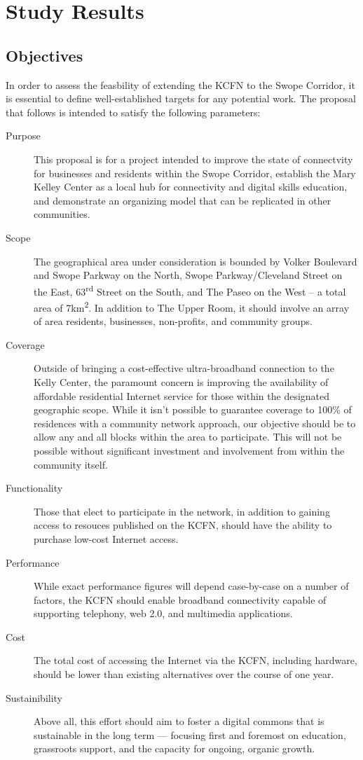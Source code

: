 \section{Study Results}
\subsection{Objectives}
In order to assess the feasbility of extending the KCFN to the Swope Corridor,
it is essential to define well-established targets for any potential work. The
proposal that follows is intended to satisfy the following parameters:
\begin{description}
\item[Purpose] This proposal is for a project intended to improve the state of
connectvity for businesses and residents within the Swope Corridor, establish
the Mary Kelley Center as a local hub for connectivity and digital skills
education, and demonstrate an organizing model that can be replicated in other
 communities.
\item[Scope] The geographical area under consideration is bounded by Volker
Boulevard and Swope Parkway on the North, Swope Parkway/Cleveland Street
on the East, 63\textsuperscript{rd} Street on the South, and The Paseo on the West
-- a total area of 7km\textsuperscript{2}. In addition to The Upper Room, it 
should involve an array of area residents, businesses, non-profits, and community groups.
\item[Coverage] Outside of bringing a cost-effective ultra-broadband connection
to the Kelly Center, the paramount concern is improving the availability of 
affordable residential Internet service for those within the designated geographic
scope. While it isn't possible to guarantee coverage to 100\% of residences with a community network approach,
our objective should be to allow any and all blocks within the area to participate. This
will not be possible without significant investment and involvement from within the
community itself.
\item[Functionality] Those that elect to participate in the network, in addition
to gaining access to resouces published on the KCFN, should have the
ability to purchase low-cost Internet access. 
\item[Performance] While exact performance figures will depend case-by-case on a
number of factors, the KCFN should enable broadband connectivity capable of supporting
telephony, web 2.0, and multimedia applications.
\item[Cost] The total cost of
accessing the Internet via the KCFN, including hardware, should be lower than existing
alternatives over the course of one year.
\item[Sustainibility] Above all, this effort should aim to foster a digital commons
that is sustainable in the long term --- focusing first and foremost on education, grassroots
support, and the capacity for ongoing, organic growth.
\end{description}
